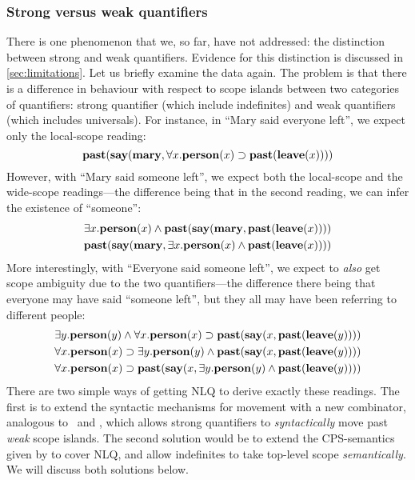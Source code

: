 \subsubsection{Strong versus weak quantifiers}
There is one phenomenon that we, so far, have not addressed: the
distinction between strong and weak quantifiers. Evidence for this
distinction is discussed in \autoref{sec:limitations}. Let us briefly
examine the data again. The problem is that there is a difference in
behaviour with respect to scope islands between two categories of
quantifiers: strong quantifier (which include indefinites) and weak
quantifiers (which includes universals). For instance, in ``Mary said
everyone left'', we expect only the local-scope reading:
\[
  \mathbf{past}(\mathbf{say}(\mathbf{mary},\forall{x}.\mathbf{person}(x)\supset\mathbf{past}(\mathbf{leave}(x))))
\]
However, with ``Mary said someone left'', we expect both the
local-scope and the wide-scope readings---the difference being that in
the second reading, we can infer the existence of ``someone'':
\begin{gather*}
  \exists{x}.\mathbf{person}(x)\wedge\mathbf{past}(\mathbf{say}(\mathbf{mary},\mathbf{past}(\mathbf{leave}(x))))\\
  \mathbf{past}(\mathbf{say}(\mathbf{mary},\exists{x}.\mathbf{person}(x)\wedge\mathbf{past}(\mathbf{leave}(x))))
\end{gather*}
More interestingly, with ``Everyone said someone left'', we expect to
\emph{also} get scope ambiguity due to the two quantifiers---the
difference there being that everyone may have said ``someone left'',
but they all may have been referring to different people:
\begin{gather*}
  \exists{y}.\mathbf{person}(y)\wedge\forall{x}.\mathbf{person}(x)\supset\mathbf{past}(\mathbf{say}(x,\mathbf{past}(\mathbf{leave}(y))))\\
  \forall{x}.\mathbf{person}(x)\supset\exists{y}.\mathbf{person}(y)\wedge\mathbf{past}(\mathbf{say}(x,\mathbf{past}(\mathbf{leave}(y))))\\
  \forall{x}.\mathbf{person}(x)\supset\mathbf{past}(\mathbf{say}(x,\exists{y}.\mathbf{person}(y)\wedge\mathbf{past}(\mathbf{leave}(y))))
\end{gather*}
There are two simple ways of getting NLQ to derive exactly these
readings. The first is to extend the syntactic mechanisms for movement
with a new combinator, analogous to \B\ and \C, which allows strong
quantifiers to \emph{syntactically} move past \emph{weak} scope
islands. The second solution would be to extend the CPS-semantics
given by \citet{moortgat2012} to cover NLQ, and allow indefinites to
take top-level scope \emph{semantically}. We will discuss both
solutions below.


